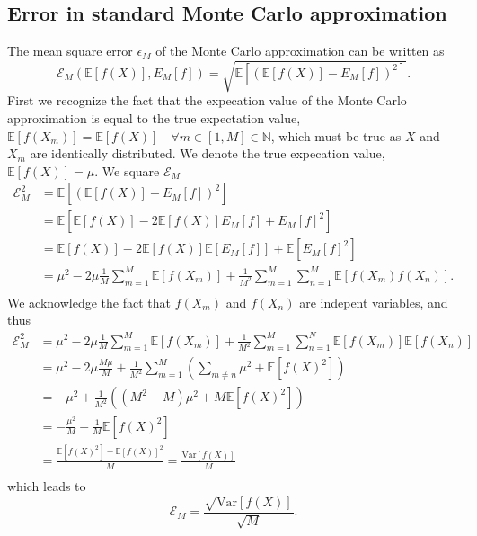 \subsection{Error in standard Monte Carlo approximation}\label{app:MC_error}
The mean square error $\epsilon_M$ of the Monte Carlo approximation can be written as 
\begin{equation}
    \mathcal{E}_M(\mathbb{E}[f(X)],E_M[f]) = \sqrt{\mathbb{E}[(\mathbb{E}[f(X)]-E_M[f])^2]}. 
\end{equation}
First we recognize the fact that the expecation value of the Monte Carlo approximation is equal to the true expectation value,  $\mathbb{E}[f(X_m)]=\mathbb{E}[f(X)]\quad \forall m\in[1, M]\in\mathbb{N}$, which must be true as $X$ and $X_m$ are identically distributed. We denote the true expecation value, $\mathbb{E}[f(X)]=\mu$. 
We square $\mathcal{E}_M$ 
\begin{equation*}
    \begin{split}
        \mathcal{E}_M^2 &= \mathbb{E}[(\mathbb{E}[f(X)]-E_M[f])^2] \\
        &= \mathbb{E}[\mathbb{E}[f(X)]-2\mathbb{E}[f(X)]E_M[f]+E_M[f]^2] \\
        &= \mathbb{E}[f(X)]-2\mathbb{E}[f(X)]\mathbb{E}[E_M[f]]+\mathbb{E}[E_M[f]^2] \\
        &= \mu^2-2\mu\frac{1}{M}\sum_{m=1}^M\mathbb{E}[f(X_m)] + \frac{1}{M^2}\sum_{m=1}^M\sum_{n=1}^M\mathbb{E}[f(X_m)f(X_n)]. \\
    \end{split}
\end{equation*}
We acknowledge the fact that $f(X_m)$ and $f(X_n)$ are indepent variables, and thus
\begin{equation*}
    \begin{split}
        \mathcal{E}_M^2 &= \mu^2-2\mu\frac{1}{M}\sum_{m=1}^M\mathbb{E}[f(X_m)] + \frac{1}{M^2}\sum_{m=1}^M\sum_{n=1}^N\mathbb{E}[f(X_m)]\mathbb{E}[f(X_n)] \\
        &= \mu^2-2\mu\frac{M\mu}{M} + \frac{1}{M^2}\sum_{m=1}^M(\sum_{m\neq n}\mu^2 + \mathbb{E}[f(X)^2]) \\
        &= -\mu^2+\frac{1}{M^2}((M^2-M)\mu^2 + M\mathbb{E}[f(X)^2]) \\
        &= -\frac{\mu^2}{M} + \frac{1}{M}\mathbb{E}[f(X)^2] \\
        &= \frac{\mathbb{E}[f(X)^2]-\mathbb{E}[f(X)]^2}{M} = \frac{\text{Var}[f(X)]}{M} \\
    \end{split}
\end{equation*}
which leads to 
\begin{equation*}
    \mathcal{E}_M = \frac{\sqrt{\text{Var}[f(X)]}}{\sqrt{M}}.
\end{equation*}




